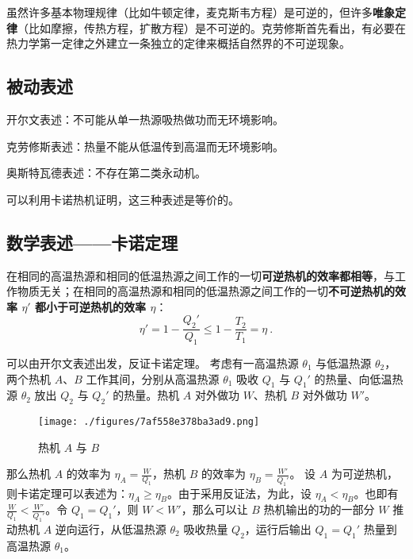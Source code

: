 
\begin{issues}
\issueDraft
\end{issues}


虽然许多基本物理规律（比如牛顿定律，麦克斯韦方程）是可逆的，但许多\textbf{唯象定律}（比如摩擦，传热方程，扩散方程）是不可逆的。克劳修斯首先看出，有必要在热力学第一定律之外建立一条独立的定律来概括自然界的不可逆现象。

\subsection{被动表述}
开尔文表述：不可能从单一热源吸热做功而无环境影响。

克劳修斯表述：热量不能从低温传到高温而无环境影响。

奥斯特瓦德表述：不存在第二类永动机。

可以利用卡诺热机证明，这三种表述是等价的。

\subsection{数学表述——卡诺定理}

在相同的高温热源和相同的低温热源之间工作的一切\textbf{可逆热机的效率都相等}，与工作物质无关；在相同的高温热源和相同的低温热源之间工作的一切\textbf{不可逆热机的效率 $\eta'$ 都小于可逆热机的效率 $\eta$}：
\begin{equation}
\eta'=1-\frac{Q_2'}{Q_1}\le 1-\frac{T_2}{T_1}=\eta~.
\end{equation}

可以由开尔文表述出发，反证卡诺定理。
考虑有一高温热源 $\theta_1$ 与低温热源 $\theta_2$，两个热机 $A$、$B$ 工作其间，分别从高温热源 $\theta_1$ 吸收 $Q_1$ 与 $Q_1'$ 的热量、向低温热源 $\theta_2$ 放出 $Q_2$ 与 $Q_2'$ 的热量。热机 $A$ 对外做功 $W$、热机 $B$ 对外做功 $W'$。
\begin{figure}[ht]
\centering
\texttt{[image: ./figures/7af558e378ba3ad9.png]}
\caption{热机 $A$ 与 $B$} \label{fig_Td2Law_7}
\end{figure}
那么热机 $A$ 的效率为 $\eta_A = \frac{W}{Q_1}$，热机 $B$ 的效率为 $\eta_B = \frac{W'}{Q_1'}$。
设 $A$ 为可逆热机，则卡诺定理可以表述为：$\eta_A \ge \eta_B$。由于采用反证法，为此，设 $\eta_A < \eta_B$。也即有 $\frac{W}{Q_1}<\frac{W'}{Q_1'}$。令 $Q_1=Q_1'$，则 $W<W'$，那么可以让 $B$ 热机输出的功的一部分 $W$ 推动热机 $A$ 逆向运行，从低温热源 $\theta_2$ 吸收热量 $Q_2$，运行后输出 $Q_1=Q_1'$ 热量到高温热源 $\theta_1$。


